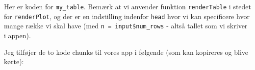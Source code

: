 \documentclass[
]{book}
\newenvironment{Shaded}{\begin{snugshade}}{\end{snugshade}}
\newcommand{\AttributeTok}[1]{\textcolor[rgb]{0.77,0.63,0.00}{#1}}
\newcommand{\FunctionTok}[1]{\textcolor[rgb]{0.00,0.00,0.00}{#1}}
\newcommand{\NormalTok}[1]{#1}
\newcommand{\OtherTok}[1]{\textcolor[rgb]{0.56,0.35,0.01}{#1}}
\newcommand{\SpecialCharTok}[1]{\textcolor[rgb]{0.00,0.00,0.00}{#1}}
\begin{document}
Her er koden for \texttt{my\_table}. Bemærk at vi anvender funktion \texttt{renderTable} i stedet for \texttt{renderPlot}, og der er en indstilling indenfor \texttt{head} hvor vi kan specificere hvor mange række vi skal have (med \texttt{n\ =\ input\$num\_rows} - altså tallet som vi skriver i appen).

\begin{Shaded}
\end{Shaded}

Jeg tilføjer de to kode chunks til vores app i følgende (som kan kopireres og blive kørte):
\end{document}
